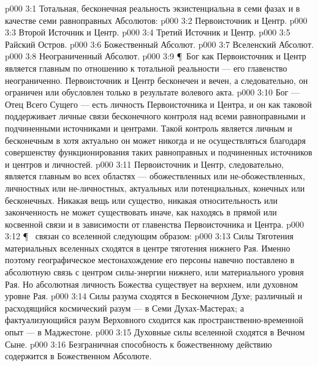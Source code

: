 \vs p000 3:1 Тотальная, бесконечная реальность экзистенциальна в семи фазах и в качестве семи равноправных Абсолютов:
\vs p000 3:2 \bibnobreakspace Первоисточник и Центр.
\vs p000 3:3 \bibnobreakspace Второй Источник и Центр.
\vs p000 3:4 \bibnobreakspace Третий Источник и Центр.
\vs p000 3:5 \bibnobreakspace Райский Остров.
\vs p000 3:6 \bibnobreakspace Божественный Абсолют.
\vs p000 3:7 \bibnobreakspace Вселенский Абсолют.
\vs p000 3:8 \bibnobreakspace Неограниченный Абсолют.
\vs p000 3:9 \P\ Бог как Первоисточник и Центр является главным по отношению к тотальной реальности --- его главенство неограниченно. Первоисточник и Центр бесконечен и вечен, а следовательно, он ограничен или обусловлен только в результате волевого акта.
\vs p000 3:10 Бог --- Отец Всего Сущего --- есть личность Первоисточника и Центра, и он как таковой поддерживает личные связи бесконечного контроля над всеми равноправными и подчиненными источниками и центрами. Такой контроль является личным и бесконечным в  хотя актуально он может никогда и не осуществляться благодаря совершенству функционирования таких равноправных и подчиненных источников и центров и личностей.
\vs p000 3:11 Первоисточник и Центр, следовательно, является главным во всех областях --- обожествленных или не\hyp{}обожествленных, личностных или не\hyp{}личностных, актуальных или потенциальных, конечных или бесконечных. Никакая вещь или существо, никакая относительность или законченность не может существовать иначе, как находясь в прямой или косвенной связи и в зависимости от главенства Первоисточника и Центра.
\vs p000 3:12 \P\  связан со вселенной следующим образом:
\vs p000 3:13 \bibnobreakspace Силы Тяготения материальных вселенных сходятся в центре тяготения нижнего Рая. Именно поэтому географическое местонахождение его персоны навечно поставлено в абсолютную связь с центром силы\hyp{}энергии нижнего, или материального уровня Рая. Но абсолютная личность Божества существует на верхнем, или духовном уровне Рая.
\vs p000 3:14 \bibnobreakspace Силы разума сходятся в Бесконечном Духе; различный и расходящийся космический разум --- в Семи Духах\hyp{}Мастерах; а фактуализующийся разум Верховного сходится как пространственно\hyp{}временной опыт --- в Маджестоне.
\vs p000 3:15 \bibnobreakspace Духовные силы вселенной сходятся в Вечном Сыне.
\vs p000 3:16 \bibnobreakspace Безграничная способность к божественному действию содержится в Божественном Абсолюте.
